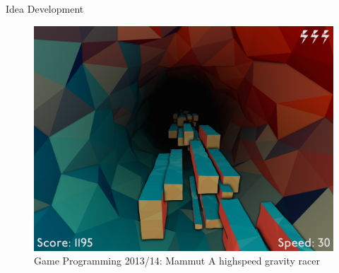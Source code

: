\slideonetoone
{Idea Development}
{
	\begin{figure}
		\centering
		\includegraphics[width=\textwidth, height=0.7\textheight, keepaspectratio]{images/mammut_cave}
		\caption{Game Programming 2013/14: 
Mammut \linebreak A highspeed gravity racer}
		\end{figure}
}
